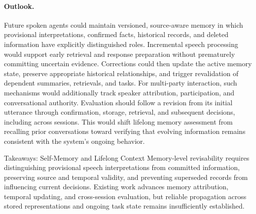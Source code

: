 \paragraph{Outlook.}
Future spoken agents could maintain versioned, source-aware memory in which provisional interpretations, confirmed facts, historical records, and deleted information have explicitly distinguished roles. Incremental speech processing would support early retrieval and response preparation without prematurely committing uncertain evidence. Corrections could then update the active memory state, preserve appropriate historical relationships, and trigger revalidation of dependent summaries, retrievals, and tasks. For multi-party interaction, such mechanisms would additionally track speaker attribution, participation, and conversational authority. Evaluation should follow a revision from its initial utterance through confirmation, storage, retrieval, and subsequent decisions, including across sessions. This would shift lifelong memory assessment from recalling prior conversations toward verifying that evolving information remains consistent with the system's ongoing behavior.

\begin{TakeawayBox}{Takeaways: Self-Memory and Lifelong Context}
Memory-level revisability requires distinguishing provisional speech interpretations from committed information, preserving source and temporal validity, and preventing superseded records from influencing current decisions. Existing work advances memory attribution, temporal updating, and cross-session evaluation, but reliable propagation across stored representations and ongoing task state remains insufficiently established.
\end{TakeawayBox}

